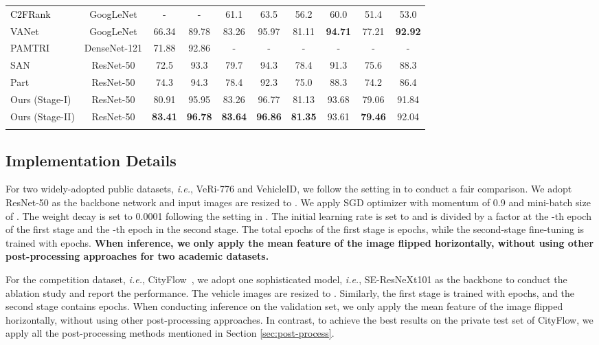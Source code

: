 \documentclass[journal]{IEEEtran}
\def\ie{\emph{i.e.}}
\newcommand{\zznote}[1]{\textcolor{black}{#1}}
\begin{document}
\begin{table*}
\begin{center}
{\begin{tabular}{l| c| c c | c c| c c| c c}
\zznote{C2FRank}~\cite{guo2018learning} & GoogLeNet & - & - & 61.1 & 63.5 & 56.2 & 60.0 & 51.4 & 53.0 \\
VANet \cite{chu2019vehicle} & GoogLeNet & 66.34 & 89.78 & 83.26 & 95.97 & 81.11 & \textbf{94.71} & 77.21 & \textbf{92.92}\\
PAMTRI \cite{tang2019pamtri} & DenseNet-121 & 71.88 & 92.86 & - & - & - & - & - & - \\
SAN \cite{qian2019stripe} & ResNet-50 & 72.5 & 93.3 & 79.7 & 94.3 & 78.4 & 91.3 & 75.6 & 88.3\\ 
Part \cite{he2019part} & ResNet-50 & 74.3 & 94.3 & 78.4 & 92.3 & 75.0 & 88.3 & 74.2 & 86.4 \\
\hline 
Ours (Stage-I) & ResNet-50 & 80.91 & 95.95 &83.26 & 96.77 & 81.13 & 93.68 & 79.06 & 91.84 \\
Ours (Stage-II) & ResNet-50 & \textbf{83.41} & \textbf{96.78} &  \textbf{83.64} & \textbf{96.86} & \textbf{81.35} & 93.61 & \textbf{79.46} & 92.04 \\
\shline
\end{tabular}}
\end{center}
\vspace{-.2in}
\end{table*}

\subsection{Implementation Details} \label{sec:implement}
For two widely-adopted public datasets, \ie, VeRi-776 and VehicleID, we follow the setting in \cite{qian2019stripe,he2019part} to conduct a fair comparison. We adopt ResNet-50 \cite{he2016deep} as the backbone network and input images are resized to . We apply SGD optimizer with momentum of 0.9 and mini-batch size of . The weight decay is set to 0.0001 following the setting in \cite{he2016deep}. The initial learning rate is set to  and is divided by a factor  at the -th epoch of the first stage and the -th epoch in the second stage. The total epochs of the first stage is  epochs, while the second-stage fine-tuning is trained with  epochs. \textbf{When inference, we only apply the mean feature of the image flipped horizontally, without using other post-processing approaches for two academic datasets.} 

For the competition dataset, \ie, CityFlow~\cite{tang@cityflow}, we adopt one sophisticated model, \ie, SE-ResNeXt101 \cite{hu2018senet} as the backbone to conduct the ablation study and report the performance. The vehicle images are resized to . Similarly, the first stage is trained with  epochs, and the second stage contains  epochs. When conducting inference on the validation set, we only apply the mean feature of the image flipped horizontally, without using other post-processing approaches. In contrast, to achieve the best results on the private test set of CityFlow, we apply all the post-processing methods mentioned in Section \ref{sec:post-process}.
\end{document}
